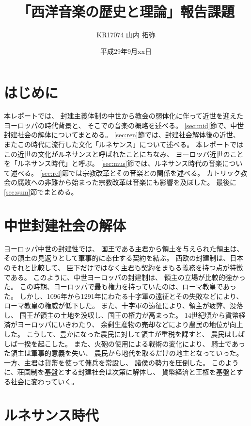\documentclass[a4j]{jarticle}
\title{「西洋音楽の歴史と理論」報告課題}
\author{KR17074 山内 拓弥}
\date{平成29年9月xx日}
\begin{document}

\large

\section{はじめに}

本レポートでは、
封建主義体制の中世から教会の弱体化に伴って近世を迎えたヨーロッパの時代背景と、
そこでの音楽の概略を述べる。
\ref{sec:mid}節で、中世封建社会の解体についてまとめる。
\ref{sec:ren}節では、封建社会解体後の近世、
またこの時代に流行した文化「ルネサンス」について述べる。
本レポートではこの近世の文化がルネサンスと呼ばれたことにちなみ、
ヨーロッパ近世のことを「ルネサンス時代」と呼ぶ。
\ref{sec:mus}節では、ルネサンス時代の音楽について述べる。
\ref{sec:rel}節では宗教改革とその音楽との関係を述べる。
カトリック教会の腐敗への非難から始まった宗教改革は音楽にも影響を及ぼした。
最後に\ref{sec:sum}節でまとめる。

\section{中世封建社会の解体\label{sec:mid}}

ヨーロッパ中世の封建性では、
国王である主君から領土を与えられた領主は、
その領土の見返りとして軍事的に奉仕する契約を結ぶ。
西欧の封建制は、日本のそれと比較して、
臣下だけではなく主君も契約をまもる義務を持つ点が特徴である。
このように、中世ヨーロッパの封建制は、
領主の立場が比較的強かった。
この時期、ヨーロッパで最も権力を持っていたのは、ローマ教皇であった。
しかし、1096年から1291年にわたる十字軍の遠征とその失敗などにより、
ローマ教皇の権威が低下した。
また、十字軍の遠征により、領主が疲弊、没落し、
国王が領主の土地を没収し、国王の権力が高まった。
14世紀頃から貨幣経済がヨーロッパにいきわたり、
余剰生産物の売却などにより農民の地位が向上した。
こうして、豊かになった農民に対して領主が重税を課すと、
農民はしばしば一揆を起こした。
また、火砲の使用による戦術の変化により、
騎士であった領主は軍事的意義を失い、
農民から地代を取るだけの地主となっていった。
一方、主君は貨幣を使って傭兵を常設し、
諸侯の勢力を圧倒した。
このように、荘園制を基盤とする封建社会は次第に解体し、
貨幣経済と王権を基盤とする社会に変わっていく。

\section{ルネサンス時代\label{sec:ren}}
\end{document}
